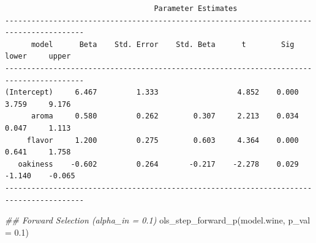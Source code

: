 \documentclass[
  letterpaper,
]{scrbook}
\newenvironment{Shaded}{\begin{snugshade}}{\end{snugshade}}
\newcommand{\AttributeTok}[1]{\textcolor[rgb]{0.40,0.45,0.13}{#1}}
\newcommand{\DocumentationTok}[1]{\textcolor[rgb]{0.37,0.37,0.37}{\textit{#1}}}
\newcommand{\FloatTok}[1]{\textcolor[rgb]{0.68,0.00,0.00}{#1}}
\newcommand{\FunctionTok}[1]{\textcolor[rgb]{0.28,0.35,0.67}{#1}}
\newcommand{\NormalTok}[1]{\textcolor[rgb]{0.00,0.23,0.31}{#1}}
\begin{document}
\begin{verbatim}
                                  Parameter Estimates                                    
----------------------------------------------------------------------------------------
      model      Beta    Std. Error    Std. Beta      t        Sig      lower     upper 
----------------------------------------------------------------------------------------
(Intercept)     6.467         1.333                  4.852    0.000     3.759     9.176 
      aroma     0.580         0.262        0.307     2.213    0.034     0.047     1.113 
     flavor     1.200         0.275        0.603     4.364    0.000     0.641     1.758 
   oakiness    -0.602         0.264       -0.217    -2.278    0.029    -1.140    -0.065 
----------------------------------------------------------------------------------------
\end{verbatim}

\begin{Shaded}
\begin{Highlighting}[]
\DocumentationTok{\#\# Forward Selection (alpha\_in = 0.1)}
\FunctionTok{ols\_step\_forward\_p}\NormalTok{(model.wine, }\AttributeTok{p\_val =} \FloatTok{0.1}\NormalTok{)}
\end{Highlighting}
\end{Shaded}
\end{document}
